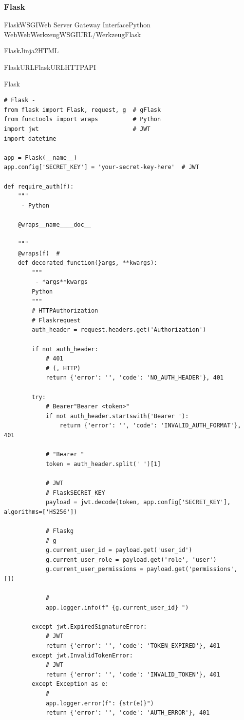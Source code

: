 \hypertarget{flask-1}{%
\subsubsection{Flask}\label{flask-1}}

FlaskWSGIWeb Server Gateway InterfacePython
WebWebWerkzeugWSGIURL/WerkzeugFlask

FlaskJinja2HTML

\important{}FlaskURLFlaskURLHTTPAPI

\important{}Flask

\begin{lstlisting}[style=python]
# Flask - 
from flask import Flask, request, g  # gFlask
from functools import wraps          # Python
import jwt                           # JWT
import datetime

app = Flask(__name__)
app.config['SECRET_KEY'] = 'your-secret-key-here'  # JWT

def require_auth(f):
    """
     - Python

    @wraps__name____doc__
    
    """
    @wraps(f)  # 
    def decorated_function(}args, **kwargs):
        """
         - *args**kwargs
        Python
        """
        # HTTPAuthorization
        # Flaskrequest
        auth_header = request.headers.get('Authorization')
        
        if not auth_header:
            # 401
            # (, HTTP)
            return {'error': '', 'code': 'NO_AUTH_HEADER'}, 401
        
        try:
            # Bearer"Bearer <token>"
            if not auth_header.startswith('Bearer '):
                return {'error': '', 'code': 'INVALID_AUTH_FORMAT'}, 401
            
            # "Bearer "
            token = auth_header.split(' ')[1]
            
            # JWT
            # FlaskSECRET_KEY
            payload = jwt.decode(token, app.config['SECRET_KEY'], algorithms=['HS256'])
            
            # Flaskg
            # g
            g.current_user_id = payload.get('user_id')
            g.current_user_role = payload.get('role', 'user')
            g.current_user_permissions = payload.get('permissions', [])
            
            # 
            app.logger.info(f" {g.current_user_id} ")
            
        except jwt.ExpiredSignatureError:
            # JWT
            return {'error': '', 'code': 'TOKEN_EXPIRED'}, 401
        except jwt.InvalidTokenError:
            # JWT
            return {'error': '', 'code': 'INVALID_TOKEN'}, 401
        except Exception as e:
            # 
            app.logger.error(f": {str(e)}")
            return {'error': '', 'code': 'AUTH_ERROR'}, 401
        

\end{lstlisting}
